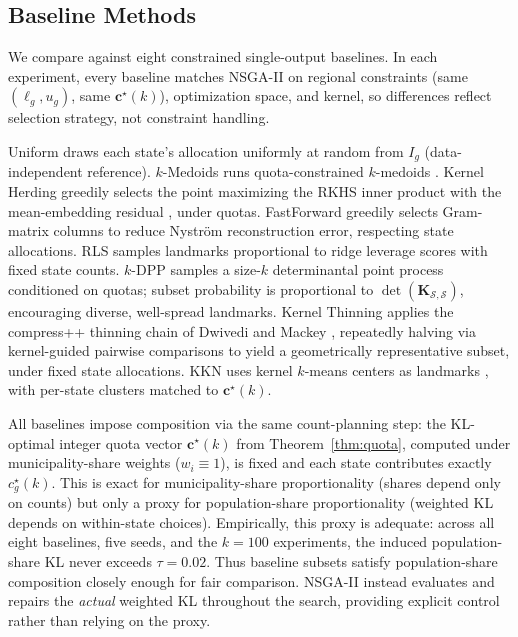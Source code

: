 \documentclass[10pt,journal]{IEEEtran}
\newcommand{\1}{\mathbf{1}}
\newcommand{\bc}{\mathbf{c}}
\newcommand{\bK}{\mathbf{K}}
\newcommand{\Sel}{\mathcal{S}}
\theoremstyle{ieeethm}
\begin{document}
\subsection{Baseline Methods}
\label{subsec:baselines}

We compare against eight constrained single-output baselines. In each experiment, every baseline matches NSGA-II on regional constraints (same $(\ell_g,u_g)$, same $\bc^\star(k)$), optimization space, and kernel, so differences reflect selection strategy, not constraint handling.

Uniform draws each state's allocation uniformly at random from $I_g$ (data-independent reference). $k$-Medoids runs quota-constrained $k$-medoids \cite{kaufman1990partitioning}. Kernel Herding greedily selects the point maximizing the RKHS inner product with the mean-embedding residual \cite{chen2010herding}, under quotas. FastForward greedily selects Gram-matrix columns to reduce Nyström reconstruction error, respecting state allocations. RLS samples landmarks proportional to ridge leverage scores \cite{natoleverage2011,alaoui2015rr} with fixed state counts. $k$-DPP samples a size-$k$ determinantal point process \cite{kulesza2012dpp} conditioned on quotas; subset probability is proportional to $\det(\bK_{\Sel,\Sel})$, encouraging diverse, well-spread landmarks. Kernel Thinning applies the compress++ thinning chain of Dwivedi and Mackey \cite{dwivedi2024kernelthinning}, repeatedly halving via kernel-guided pairwise comparisons to yield a geometrically representative subset, under fixed state allocations. KKN uses kernel $k$-means centers as landmarks \cite{he_zhang_2018}, with per-state clusters matched to $\bc^\star(k)$.

All baselines impose composition via the same count-planning step: the KL-optimal integer quota vector $\bc^\star(k)$ from Theorem~\ref{thm:quota}, computed under municipality-share weights ($w_i\equiv 1$), is fixed and each state contributes exactly $c_g^\star(k)$. This is exact for municipality-share proportionality (shares depend only on counts) but only a proxy for population-share proportionality (weighted KL depends on within-state choices). Empirically, this proxy is adequate: across all eight baselines, five seeds, and the $k=100$ experiments, the induced population-share KL never exceeds $\tau=0.02$. Thus baseline subsets satisfy population-share composition closely enough for fair comparison. NSGA-II instead evaluates and repairs the \emph{actual} weighted KL throughout the search, providing explicit control rather than relying on the proxy.
\end{document}
